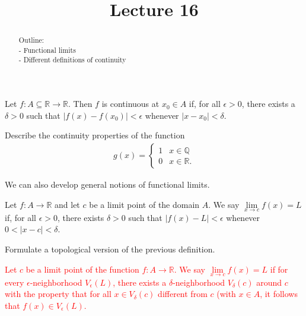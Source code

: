 \documentclass{ximera}
\begin{document}
    \title{Lecture 16}
    
    \begin{abstract}  
    Outline: \\
    - Functional limits \\
    - Different definitions of continuity
\end{abstract}

\maketitle

\begin{definition}
    Let $f:A \subseteq \mathbb{R} \to \mathbb{R}$.   Then $f$ is continuous at $x_0 \in A$ if, for all $\epsilon > 0$, there exists a $\delta >0$ such that $|f(x) - f(x_0)| < \epsilon$ whenever $|x-x_0|< \delta$.
\end{definition}

\begin{exercise}
    Describe the continuity properties of the function
    \begin{align}
        g(x) = \begin{cases}
            1 & x \in \mathbb{Q}\\
            0 & x \in \mathbb{R}.
        \end{cases}
    \end{align}
\end{exercise}

We can also develop general notions of functional limits.

\begin{definition}
    Let $f : A \to \mathbb{R}$ and let $c$ be a limit point of the domain $A$.  We say $\lim\limits_{x\to c} f(x) = L$ if, for all $\epsilon > 0$, there exists $\delta > 0$ such that $|f(x) - L| < \epsilon$ whenever $0 < |x-c|< \delta$.
\end{definition}

\begin{exercise}
    Formulate a topological version of the previous definition.  
\end{exercise}
\vspace{-0.3in}
\textcolor{red}{
\begin{definition}
    Let $c$ be a limit point of the function $f:A \to \mathbb{R}$.  We say $\lim\limits_{x\to c} f(x) = L$ if for every $\epsilon$-neighborhood $V_\epsilon(L)$, there exists a $\delta$-neighborhood $V_\delta(c)$ around $c$ with the property that for all $x \in V_\delta(c)$ different from $c$ (with $x \in A$, it follows that $f(x) \in V_\epsilon(L)$.
\end{definition}
}
\end{document}
